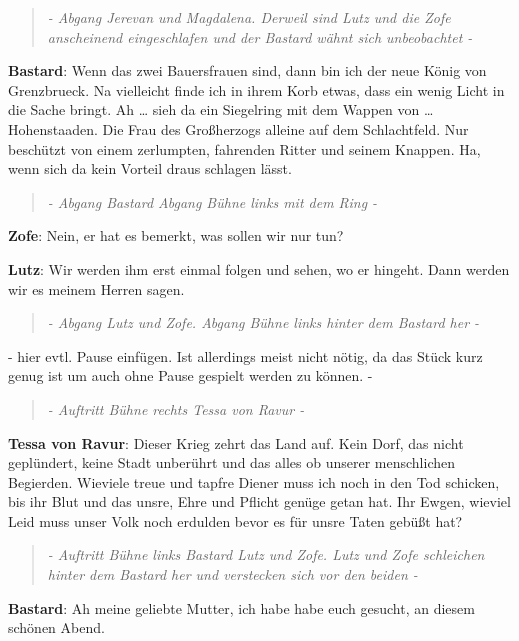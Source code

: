\documentclass[a5paper,6pt]{book}
\begin{document}
\begin{quote}
  \textit{- Abgang Jerevan und Magdalena. Derweil sind Lutz und die Zofe anscheinend eingeschlafen und der Bastard wähnt sich unbeobachtet -}
 \end{quote}


\textbf{Bastard}: Wenn das zwei Bauersfrauen sind, dann bin ich der neue König von Grenzbrueck.
Na vielleicht finde ich in ihrem Korb etwas, dass ein wenig Licht in die Sache bringt.
Ah … sieh da ein Siegelring mit dem Wappen von … Hohenstaaden. Die Frau des Großherzogs alleine auf dem Schlachtfeld. Nur beschützt von einem zerlumpten, fahrenden Ritter und seinem Knappen. Ha, wenn sich da kein Vorteil draus schlagen lässt.

\begin{quote}
  \textit{- Abgang Bastard Abgang Bühne links mit dem Ring -}
 \end{quote}


\textbf{Zofe}: Nein, er hat es bemerkt, was sollen wir nur tun?

\textbf{Lutz}: Wir werden ihm erst einmal folgen und sehen, wo er hingeht. Dann werden wir es meinem Herren sagen.

\begin{quote}
  \textit{- Abgang Lutz und Zofe. Abgang Bühne links hinter dem Bastard her -}
 \end{quote}

- hier evtl. Pause einfügen. Ist allerdings meist nicht nötig, da das Stück kurz genug ist um auch ohne Pause gespielt werden zu können. -

\begin{quote}
  \textit{- Auftritt Bühne rechts Tessa von Ravur -}
 \end{quote}


\textbf{Tessa von Ravur}: Dieser Krieg zehrt das Land auf. Kein Dorf, das nicht geplündert, keine Stadt unberührt und das alles ob unserer menschlichen Begierden. Wieviele treue und tapfre Diener muss ich noch in den Tod schicken, bis ihr Blut und das unsre, Ehre und Pflicht genüge getan hat. Ihr Ewgen, wieviel Leid muss unser Volk noch erdulden bevor es für unsre Taten gebüßt hat?

\begin{quote}
  \textit{- Auftritt Bühne links Bastard Lutz und Zofe. Lutz und Zofe schleichen hinter dem Bastard her und verstecken sich vor den beiden -}
 \end{quote}

\textbf{Bastard}: Ah meine geliebte Mutter, ich habe habe euch gesucht, an diesem schönen Abend.
\end{document}
